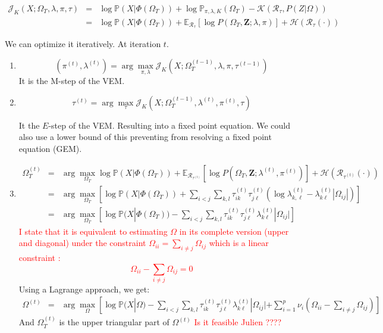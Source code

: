 \documentclass[10pt]{article}
\begin{document}
\begin{eqnarray*}
\mathcal{J}_K(X;\Omega_T,\lambda,\pi,\tau) &=& \log  \mathbb{P}(X | \Phi(\Omega_T))  + \log \mathbb{P}_{\pi,\lambda,K}(\Omega_T)  -  \mathcal{K}(\mathcal{R}_{\tau}, P(Z | \Omega))\\
 &=&  \log  \mathbb{P}(X | \Phi(\Omega_T))  + \mathbb{E}_{\mathcal{R}_{\tau}} \left[\log  P(\Omega_T ,\mathbf{Z}; \lambda,\pi)    \right] + \mathcal{H}(\mathcal{R}_{\tau}(\cdot))
 \end{eqnarray*}


We can optimize it iteratively. At iteration $t$. 

\begin{enumerate}
\item  $$(\pi^{(t)},\lambda^{(t)}) = \arg \max_{\pi,\lambda} \mathcal{J}_K(X;\Omega_T^{(t-1)},\lambda,\pi,\tau^{(t-1)})$$
It is the M-step of the VEM. 
\item   $$\tau^{(t)} = \arg \max_{\tau}  \mathcal{J}_K(X;\Omega_T^{(t-1)},\lambda^{(t)},\pi^{(t)},\tau)$$

It the $E$-step of the VEM. Resulting into a fixed point equation.  We could also use a lower bound of this preventing from resolving a fixed point equation (GEM). 

\item 
\begin{eqnarray*}
\Omega^{(t)}_T &=& \arg \max_{\Omega_T}  \log  \mathbb{P}(X | \Phi(\Omega_T))  + \mathbb{E}_{\mathcal{R}_{\tau^{(t)}}} \left[\log  P(\Omega_T ,\mathbf{Z}; \lambda^{(t)},\pi^{(t)})    \right] + \mathcal{H}(\mathcal{R}_{\tau^{(t)}}(\cdot))\\
&=&  \arg \max_{\Omega_T}   \left[ \log  \mathbb{P}(X | \Phi(\Omega_T))  +  \sum_{i<j} \sum_{k,l}\tau^{(t)}_{ik}\tau^{(t)}_{j\ell} (  \log \lambda^{(t)}_{k,\ell}  - \lambda^{(t)}_{k\ell} |\Omega_{ij}| )  \right]  \\
&=&  \arg \max_{\Omega_T}    \left[ \log  \mathbb{P}(X | \Phi(\Omega_T))  -   \sum_{i<j} \sum_{k,l}\tau^{(t)}_{ik}\tau^{(t)}_{j\ell}   \lambda^{(t)}_{k\ell} |\Omega_{ij}|   \right]    
\end{eqnarray*}
\textcolor{red}{I state that it is equivalent to estimating  $\Omega$ in its complete version (upper and diagonal) under the constraint  $\Omega_{ii} = \sum_{i\neq j } \Omega_{ij}$ which is a linear constraint : 
$$  \Omega_{ii} -  \sum_{i\neq j } \Omega_{ij}=0$$}
Using a Lagrange approach, we get: 
\begin{eqnarray*}
\Omega^{(t)}  &=& \arg \max_{\Omega}    \left[ \log  \mathbb{P}(X | \Omega )  -   \sum_{i<j} \sum_{k,l}\tau^{(t)}_{ik}\tau^{(t)}_{j\ell}   \lambda^{(t)}_{k\ell} |\Omega_{ij}|   + \sum_{i=1}^p\nu_i    \left( \Omega_{ii} -  \sum_{i\neq j } \Omega_{ij} \right) \right]
  \end{eqnarray*}
And $\Omega_T^{(t)}$ is the upper triangular part of $\Omega^{(t)}$
\textcolor{red}{Is it feasible Julien ???? }




\end{enumerate}
\end{document}
